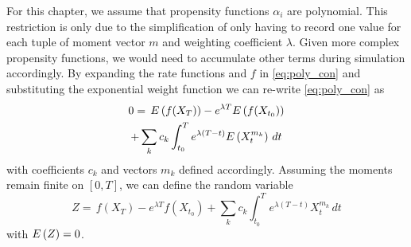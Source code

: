 For this chapter, we assume that propensity functions $\alpha_i$ are polynomial.
This restriction is only due to the simplification of only having to record one value for each tuple of moment vector $m$ and weighting coefficient $\lambda$.
Given more complex propensity functions, we would need to accumulate other terms during simulation accordingly.
By expanding the rate functions and $f$ in \eqref{eq:poly_con} and substituting the
exponential weight function we can re-write \eqref{eq:poly_con} as
\begin{multline}\label{eq:simpl_exp}
        0 =\,
         {E}\left(f(X_{T})\right)
        - e^{\lambda T}{E}\left(f(X_{t_0})\right)\\
        + \sum_{k}c_k\int_{t_0}^{T}e^{\lambda(T-t)}{E}\left(X_t^{m_k}\right)\,dt
\end{multline}
with coefficients $c_k$ and vectors $m_k$ defined accordingly.
Assuming the moments remain finite on $[0,T]$, we can define the random variable
\begin{equation}\label{eq:z}
        Z =\,
         f(X_{T})
        - e^{\lambda T}f(X_{t_0})
        + \sum_{k}c_k\int_{t_0}^{T}e^{\lambda(T-t)}X_t^{m_k}\,dt
\end{equation}
with ${E}\left(Z\right)=0$.

